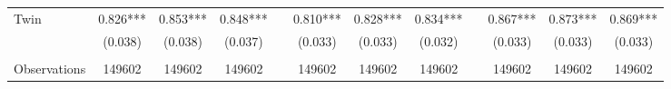 \begin{landscape}
\begin{table}[htpb!]
\begin{center}
\begin{tabular}{lcccp{2mm}cccp{2mm}ccc}
Twin&0.826***&0.853***&0.848***&&0.810***&0.828***&0.834***&&0.867***&0.873***&0.869***\\
&(0.038)&(0.038)&(0.037)&&(0.033)&(0.033)&(0.032)&&(0.033)&(0.033)&(0.033)\\
\begin{footnotesize}\end{footnotesize}&\begin{footnotesize}\end{footnotesize}&\begin{footnotesize}\end{footnotesize}&\begin{footnotesize}\end{footnotesize}&\begin{footnotesize}\end{footnotesize}&\begin{footnotesize}\end{footnotesize}&\begin{footnotesize}\end{footnotesize}&\begin{footnotesize}\end{footnotesize}&\begin{footnotesize}\end{footnotesize}&\begin{footnotesize}\end{footnotesize}&\begin{footnotesize}\end{footnotesize}&\begin{footnotesize}\end{footnotesize}\\Observations&149602&149602&149602&&149602&149602&149602&&149602&149602&149602\\

\end{tabular}
\end{center}
\end{table}
\end{landscape}
